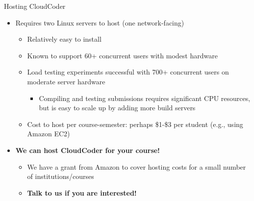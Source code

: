 \documentclass{beamer}
\begin{document}

\begin{frame}{Hosting CloudCoder}

\begin{itemize}
  \item Requires two Linux servers to host (one network-facing)
    \begin{itemize}
    \item Relatively easy to install
    \item Known to support 60+ concurrent users with modest hardware
    \item Load testing experiments successful with 700+ concurrent users
          on moderate server hardware
      \begin{itemize}
      \item Compiling and testing submissions requires significant
            CPU resources, but is easy to scale up by adding more
            build servers
      \end{itemize}
    \item Cost to host per course-semester: perhaps \$1-\$3 per student
          (e.g., using Amazon EC2)
    \end{itemize}
  \item {\bf We can host CloudCoder for your course!}
    \begin{itemize}
    \item We have a grant from Amazon to cover hosting costs for
          a small number of institutions/courses
    \item {\bf Talk to us if you are interested!}
    \end{itemize}
\end{itemize}

\end{frame}
\end{document}
